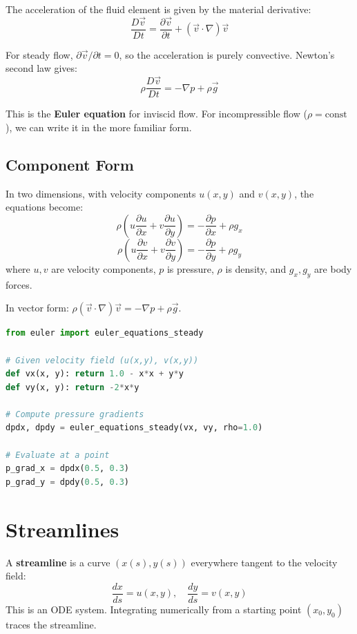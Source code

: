 The acceleration of the fluid element is given by the material derivative:
\[
\frac{D\vec{v}}{Dt} = \frac{\partial \vec{v}}{\partial t} + (\vec{v} \cdot \nabla)\vec{v}
\]

For steady flow, $\partial \vec{v}/\partial t = 0$, so the acceleration is purely convective.
Newton's second law gives:
\[
\rho \frac{D\vec{v}}{Dt} = -\nabla p + \rho \vec{g}
\]

This is the \textbf{Euler equation} for inviscid flow. For incompressible flow ($\rho = \text{const}$),
we can write it in the more familiar form.

\subsection{Component Form}

In two dimensions, with velocity components $u(x,y)$ and $v(x,y)$, the equations become:
\[
\rho \left( u \frac{\partial u}{\partial x} + v \frac{\partial u}{\partial y} \right) = -\frac{\partial p}{\partial x} + \rho g_x
\]
\[
\rho \left( u \frac{\partial v}{\partial x} + v \frac{\partial v}{\partial y} \right) = -\frac{\partial p}{\partial y} + \rho g_y
\]
where $u,v$ are velocity components, $p$ is pressure, $\rho$ is density, and $g_x, g_y$ are body forces.

In vector form: $\rho (\vec{v} \cdot \nabla) \vec{v} = -\nabla p + \rho \vec{g}$.

\begin{lstlisting}[language=Python, caption=Euler's steady-flow equations]
from euler import euler_equations_steady

# Given velocity field (u(x,y), v(x,y))
def vx(x, y): return 1.0 - x*x + y*y
def vy(x, y): return -2*x*y

# Compute pressure gradients
dpdx, dpdy = euler_equations_steady(vx, vy, rho=1.0)

# Evaluate at a point
p_grad_x = dpdx(0.5, 0.3)
p_grad_y = dpdy(0.5, 0.3)
\end{lstlisting}

\section{Streamlines}

A \textbf{streamline} is a curve $(x(s), y(s))$ everywhere tangent to the velocity field:
\[
\frac{dx}{ds} = u(x,y), \quad \frac{dy}{ds} = v(x,y)
\]
This is an ODE system. Integrating numerically from a starting point $(x_0, y_0)$ traces the streamline.

